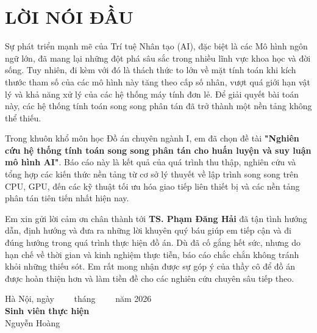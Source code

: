 \section*{LỜI NÓI ĐẦU}

Sự phát triển mạnh mẽ của Trí tuệ Nhân tạo (AI), đặc biệt là các Mô hình ngôn ngữ lớn, đã mang lại những đột phá sâu sắc trong nhiều lĩnh vực khoa học và đời sống. Tuy nhiên, đi kèm với đó là thách thức to lớn về mặt tính toán khi kích thước tham số của các mô hình này tăng theo cấp số nhân, vượt quá giới hạn vật lý và khả năng xử lý của các hệ thống máy tính đơn lẻ. Để giải quyết bài toán này, các hệ thống tính toán song song phân tán đã trở thành một nền tảng không thể thiếu.

Trong khuôn khổ môn học Đồ án chuyên ngành I, em đã chọn đề tài \textbf{"Nghiên cứu hệ thống tính toán song song phân tán cho huấn luyện và suy luận mô hình AI"}. Báo cáo này là kết quả của quá trình thu thập, nghiên cứu và tổng hợp các kiến thức nền tảng từ cơ sở lý thuyết về lập trình song song trên CPU, GPU, đến các kỹ thuật tối ưu hóa giao tiếp liên thiết bị và các nền tảng phân tán tiên tiến nhất hiện nay.

Em xin gửi lời cảm ơn chân thành tới \textbf{TS. Phạm Đăng Hải} đã tận tình hướng dẫn, định hướng và đưa ra những lời khuyên quý báu giúp em tiếp cận và đi đúng hướng trong quá trình thực hiện đồ án. Dù đã cố gắng hết sức, nhưng do hạn chế về thời gian và kinh nghiệm thực tiễn, báo cáo chắc chắn không tránh khỏi những thiếu sót. Em rất mong nhận được sự góp ý của thầy cô để đồ án được hoàn thiện hơn và làm tiền đề cho các nghiên cứu chuyên sâu tiếp theo.

\vspace{1cm}
\begin{flushright}
    Hà Nội, ngày \ \ \ \ tháng \ \ \ \ năm 2026 \\
    \textbf{Sinh viên thực hiện} \\
    \vspace{1.5cm}
    Nguyễn Hoàng
\end{flushright}
\cleardoublepage